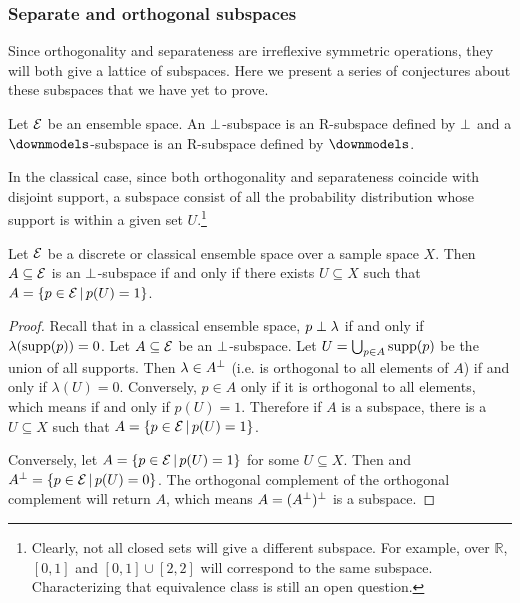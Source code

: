 \subsubsection{Separate and orthogonal subspaces}

Since orthogonality and separateness are irreflexive symmetric operations, they will both give a lattice of subspaces. Here we present a series of conjectures about these subspaces that we have yet to prove.

\begin{defn}
	Let $\mathcal{E}$ be an ensemble space. An $\perp$-subspace is an R-subspace defined by $\perp$ and a $\separate$-subspace is an R-subspace defined by $\separate$.
\end{defn}

In the classical case, since both orthogonality and separateness coincide with disjoint support, a subspace consist of all the probability distribution whose support is within a given set $U$.\footnote{Clearly, not all closed sets will give a different subspace. For example, over $\mathbb{R}$, $[0,1]$ and $[0,1]\cup[2,2]$ will correspond to the same subspace. Characterizing that equivalence class is still an open question.}

\begin{prop}
	Let $\mathcal{E}$ be a discrete or classical ensemble space over a sample space $X$. Then $A \subseteq \mathcal{E}$ is an $\perp$-subspace if and only if there exists $U \subseteq X$ such that $A = \{ p \in \mathcal{E} \, | \, p(U) = 1\}$.
\end{prop}

\begin{proof}
	Recall that in a classical ensemble space, $p \perp \lambda$ if and only if $\lambda(\mathrm{supp}(p)) = 0$. Let $A \subseteq \mathcal{E}$ be an $\perp$-subspace. Let $U = \bigcup_{p \in A} \mathrm{supp}(p)$ be the union of all supports. Then $\lambda \in A^{\perp}$ (i.e. is orthogonal to all elements of $A$) if and only if $\lambda(U) = 0$. Conversely, $p \in A$ only if it is orthogonal to all elements, which means if and only if $p(U) = 1$. Therefore if $A$ is a subspace, there is a $U \subseteq X$ such that $A = \{ p \in \mathcal{E} \, | \, p(U) = 1\}$.
	
	Conversely, let $A = \{ p \in \mathcal{E} \, | \, p(U) = 1\}$ for some $U \subseteq X$. Then and $A^{\perp} = \{ p \in \mathcal{E} \, | \, p(U) = 0\}$. The orthogonal complement of the orthogonal complement will return $A$, which means $A = (A^{\perp})^{\perp}$ is a subspace.
\end{proof}

